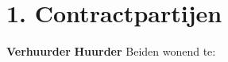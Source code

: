 \section*{1. Contractpartijen}
\textbf{Verhuurder}
\ContractLandlordsNL
\vspace{0.5cm}
\textbf{Huurder}
\ContractTenantsNL
Beiden wonend te: \Propaddress
